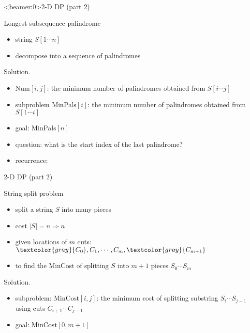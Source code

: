 \begin{frame}<beamer:0>{2-D DP (part 2)}
  \begin{exampleblock}{Longest subsequence palindrome }
    \begin{itemize}
      \item string $S[1 \cdots n]$
      \item decompose into a sequence of palindromes
    \end{itemize}
  \end{exampleblock}

  \begin{block}{Solution.}
    \begin{itemize}
      \item $\text{Num}[i,j]$: the minimum number of palindromes obtained from $S[i \cdots j]$
      \item subproblem $\text{MinPals}[i]$: the minimum number of palindromes obtained from $S[1 \cdots i]$
      \item goal: $\text{MinPals}[n]$
      \item question: what is the start index of the last palindrome?
      \item recurrence:
    \end{itemize}
  \end{block}
\end{frame}
\begin{frame}{2-D DP (part 2)}
  \begin{exampleblock}{String split problem }
    \begin{itemize}
      \item split a string $S$ into many pieces
      \item cost $|S| = n \Rightarrow n$
      \item given locations of $m$ cuts: $\textcolor{gray}{C_{0}}, C_{1}, \cdots, C_{m}, \textcolor{gray}{C_{m+1}}$
      \item to find the MinCost of splitting $S$ into $m+1$ pieces $S_{0} \cdots S_{m}$
    \end{itemize}
  \end{exampleblock}

  \begin{block}{Solution.}
    \begin{itemize}
      \item subproblem: $\text{MinCost}[i,j]$: the minimum cost of splitting substring $S_{i} \cdots S_{j-1}$ using cuts $C_{i+1} \cdots C_{j-1}$
      \item goal: $\text{MinCost}[0,m+1]$
    \end{itemize}
  \end{block}
\end{frame}
